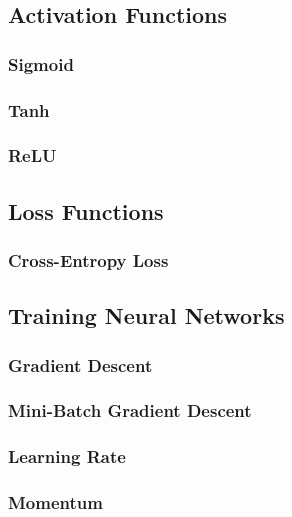         \subsection{Activation Functions}

            \subsubsection{Sigmoid}

            \subsubsection{Tanh}
            
            \subsubsection{ReLU}
            
        \subsection{Loss Functions}
            
            \subsubsection{Cross-Entropy Loss}
        
        \subsection{Training Neural Networks}
            
            \subsubsection{Gradient Descent}
            
            \subsubsection{Mini-Batch Gradient Descent}
            
            \subsubsection{Learning Rate}
            
            \subsubsection{Momentum}
            
